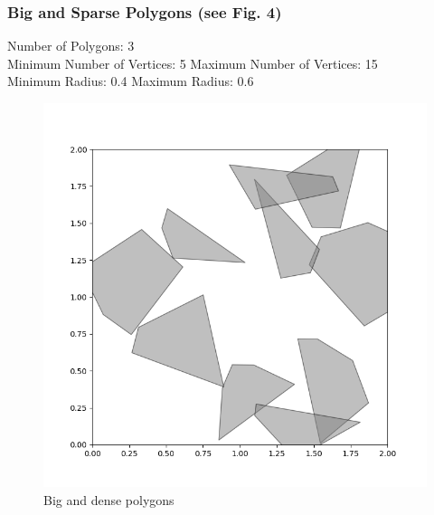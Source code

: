 \documentclass{article}
\begin{document}
\subsubsection{Big and Sparse Polygons (see Fig. 4)}
Number of Polygons: 3
\\Minimum Number of Vertices: 5 \space\space\space\space\space\space Maximum Number of Vertices: 15 
\\Minimum Radius: 0.4 \space\space\space\space\space\space\space\space\space\space\space \space\space\space\space\space\space \space\space\space Maximum Radius: 0.6
\begin{figure}[htbp]
  \centering
  \begin{minipage}{0.45\textwidth}
    \includegraphics[width=\linewidth]{part1_big_dense.png}
    \caption{Big and dense polygons}
  \end{minipage}\hfill
  \begin{minipage}{0.45\textwidth}

\end{minipage}
\end{figure}
\end{document}
